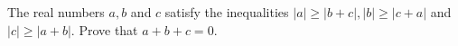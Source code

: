 The real numbers $a,b$ and $c$ satisfy the inequalities $|a|\ge |b+c|,|b|\ge |c+a|$ and $|c|\ge |a+b|$. Prove that $a+b+c=0$.